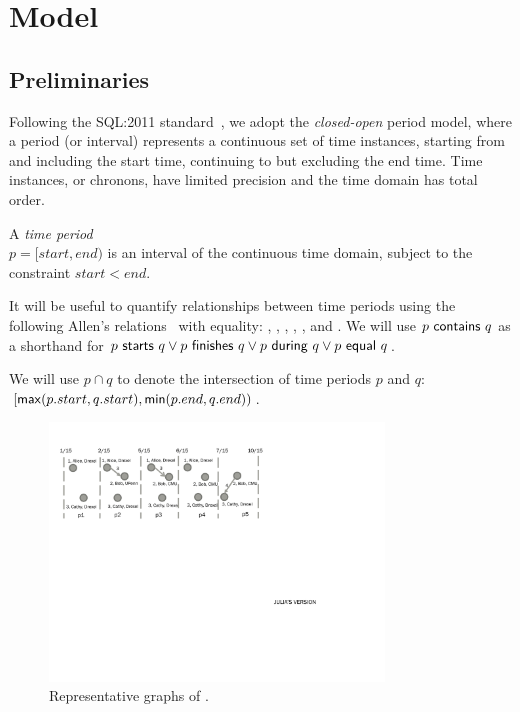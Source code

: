 \section{Model}
\label{sec:model}

\subsection{Preliminaries}
\label{sec:model:prelim}

Following the SQL:2011
standard~\cite{DBLP:journals/sigmod/KulkarniM12}, we adopt the {\em
  closed-open} period model, where a period (or interval) represents a
continuous set of time instances, starting from and including the
start time, continuing to but excluding the end time.  Time instances,
or chronons, have limited precision and the time domain has total
order.

\begin{definition}
A {\em time period} \\$p = [start, end)$ is an interval of the
  continuous time domain, subject to the constraint $start < end$.
\label{def:period} 
\end{definition}

It will be useful to quantify relationships between time periods using
the following Allen's relations~\cite{allen83} with equality:
, , ,
, , and .  We
will use $p~\mathsf{contains}~q$ as a shorthand for
$p~\mathsf{starts}~q \vee p~\mathsf{finishes}~q \vee
p~\mathsf{during}~q \vee p~\mathsf{equal}~q$.

We will use $p \cap q$ to denote the intersection of time periods $p$
and $q$: $[\mathsf{max}(p.start,q.start), \mathsf{min}(p.end,
  q.end))$.

\begin{figure}
\centering
\includegraphics[width=3.5in]{figs/T1_graphs.pdf}
\caption{Representative graphs of \tg {}.}
\label{fig:tg_rg}
\end{figure}

